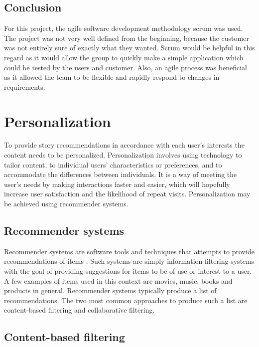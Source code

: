 \subsection{Conclusion}
For this project, the agile software development methodology scrum was used. The project was not very well defined from the beginning, because the customer was not entirely sure of exactly what they wanted. Scrum would be helpful in this regard as it would allow the group to quickly make a simple application which could be tested by the users and customer. Also, an agile process was beneficial as it allowed the team to be flexible and rapidly respond to changes in requirements. 

\section{Personalization}
\label{sec:personalization_algorithms}

To provide story recommendations in accordance with each user's interests the content needs to be personalized. Personalization involves using technology to tailor content, to individual users' characteristics or preferences, and to accommodate the differences between individuals. It is a way of meeting the user's needs by making interactions faster and easier, which will hopefully increase user satisfaction and the likelihood of repeat visits. Personalization may be achieved using recommender systems.

\subsection{Recommender systems}

Recommender systems are software tools and techniques that attempts to provide recommendations of items \cite{HM4}. Such systems are simply information filtering systems with the goal of providing suggestions for items to be of use or interest to a user. A few examples of items used in this context are movies, music, books and products in general. Recommender systems typically produce a list of recommendations.  The two most common approaches to produce such a list are content-based filtering and collaborative filtering.

\subsection{Content-based filtering}

